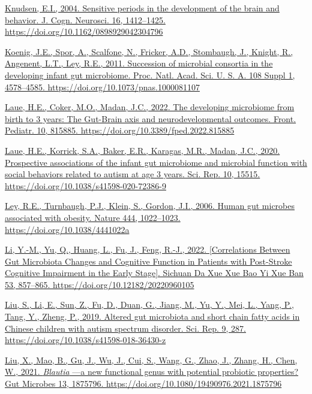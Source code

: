 \documentclass[
]{article}
\begin{document}
\href{https://www.zotero.org/google-docs/?uydJ8e}{Knudsen, E.I., 2004.
Sensitive periods in the development of the brain and behavior. J. Cogn.
Neurosci. 16, 1412--1425. https://doi.org/10.1162/0898929042304796}

\href{https://www.zotero.org/google-docs/?uydJ8e}{Koenig, J.E., Spor,
A., Scalfone, N., Fricker, A.D., Stombaugh, J., Knight, R., Angenent,
L.T., Ley, R.E., 2011. Succession of microbial consortia in the
developing infant gut microbiome. Proc. Natl. Acad. Sci. U. S. A. 108
Suppl 1, 4578--4585. https://doi.org/10.1073/pnas.1000081107}

\href{https://www.zotero.org/google-docs/?uydJ8e}{Laue, H.E., Coker,
M.O., Madan, J.C., 2022. The developing microbiome from birth to 3
years: The Gut-Brain axis and neurodevelopmental outcomes. Front.
Pediatr. 10, 815885. https://doi.org/10.3389/fped.2022.815885}

\href{https://www.zotero.org/google-docs/?uydJ8e}{Laue, H.E., Korrick,
S.A., Baker, E.R., Karagas, M.R., Madan, J.C., 2020. Prospective
associations of the infant gut microbiome and microbial function with
social behaviors related to autism at age 3 years. Sci. Rep. 10, 15515.
https://doi.org/10.1038/s41598-020-72386-9}

\href{https://www.zotero.org/google-docs/?uydJ8e}{Ley, R.E., Turnbaugh,
P.J., Klein, S., Gordon, J.I., 2006. Human gut microbes associated with
obesity. Nature 444, 1022--1023. https://doi.org/10.1038/4441022a}

\href{https://www.zotero.org/google-docs/?uydJ8e}{Li, Y.-M., Yu, Q.,
Huang, L., Fu, J., Feng, R.-J., 2022. {[}Correlations Between Gut
Microbiota Changes and Cognitive Function in Patients with Post-Stroke
Cognitive Impairment in the Early Stage{]}. Sichuan Da Xue Xue Bao Yi
Xue Ban 53, 857--865. https://doi.org/10.12182/20220960105}

\href{https://www.zotero.org/google-docs/?uydJ8e}{Liu, S., Li, E., Sun,
Z., Fu, D., Duan, G., Jiang, M., Yu, Y., Mei, L., Yang, P., Tang, Y.,
Zheng, P., 2019. Altered gut microbiota and short chain fatty acids in
Chinese children with autism spectrum disorder. Sci. Rep. 9, 287.
https://doi.org/10.1038/s41598-018-36430-z}

\href{https://www.zotero.org/google-docs/?uydJ8e}{Liu, X., Mao, B., Gu,
J., Wu, J., Cui, S., Wang, G., Zhao, J., Zhang, H., Chen, W., 2021.
\emph{Blautia} ---a new functional genus with potential probiotic
properties? Gut Microbes 13, 1875796.
https://doi.org/10.1080/19490976.2021.1875796}
\end{document}
